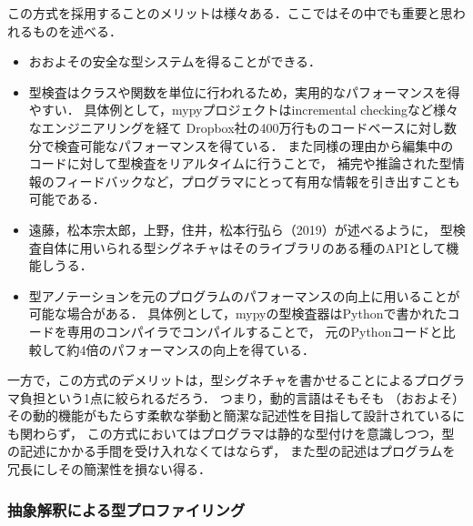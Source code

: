 この方式を採用することのメリットは様々ある．ここではその中でも重要と思われるものを述べる．
\begin{itemize}
  \item おおよその安全な型システムを得ることができる．
  \item 型検査はクラスや関数を単位に行われるため，実用的なパフォーマンスを得やすい．
        具体例として，mypyプロジェクトはincremental checkingなど様々なエンジニアリングを経て
        Dropbox社の400万行ものコードベースに対し数分で検査可能なパフォーマンスを得ている\cite{dropbox}．
        また同様の理由から編集中のコードに対して型検査をリアルタイムに行うことで，
        補完や推論された型情報のフィードバックなど，プログラマにとって有用な情報を引き出すことも可能である．
  \item 遠藤，松本宗太郎，上野，住井，松本行弘ら（2019）\cite{ruby-progress-report}が述べるように，
        型検査自体に用いられる型シグネチャはそのライブラリのある種のAPIとして機能しうる．
  \item 型アノテーションを元のプログラムのパフォーマンスの向上に用いることが可能な場合がある．
        具体例として，mypyの型検査器はPythonで書かれたコードを専用のコンパイラでコンパイルすることで，
        元のPythonコードと比較して約4倍のパフォーマンスの向上を得ている．\cite{dropbox}
\end{itemize}

一方で，この方式のデメリットは，型シグネチャを書かせることによるプログラマ負担という1点に絞られるだろう．
つまり，動的言語はそもそも
（おおよそ）その動的機能がもたらす柔軟な挙動と簡潔な記述性を目指して設計されているにも関わらず，
この方式においてはプログラマは静的な型付けを意識しつつ，型の記述にかかる手間を受け入れなくてはならず，
また型の記述はプログラムを冗長にしその簡潔性を損ない得る．

\subsubsection{抽象解釈による型プロファイリング}

